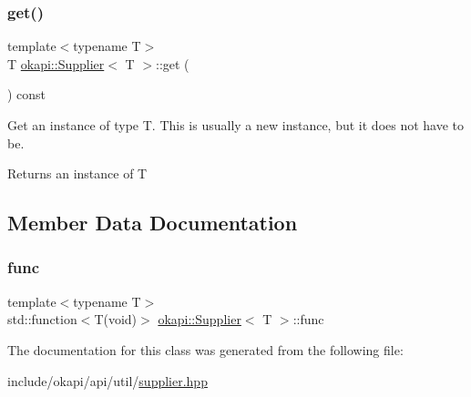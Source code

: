 \subsubsection{\texorpdfstring{get()}{get()}}
{\footnotesize\ttfamily template$<$typename T$>$ \\
T \mbox{\hyperlink{classokapi_1_1Supplier}{okapi\+::\+Supplier}}$<$ T $>$\+::get (\begin{DoxyParamCaption}{ }\end{DoxyParamCaption}) const\hspace{0.3cm}{\ttfamily [inline]}}

Get an instance of type T. This is usually a new instance, but it does not have to be. \begin{DoxyReturn}{Returns}
an instance of T 
\end{DoxyReturn}


\subsection{Member Data Documentation}
\mbox{\label{classokapi_1_1Supplier_aad4dde721930a73ed5077011bab8203c}} 
\subsubsection{\texorpdfstring{func}{func}}
{\footnotesize\ttfamily template$<$typename T$>$ \\
std\+::function$<$T(void)$>$ \mbox{\hyperlink{classokapi_1_1Supplier}{okapi\+::\+Supplier}}$<$ T $>$\+::func\hspace{0.3cm}{\ttfamily [protected]}}



The documentation for this class was generated from the following file\+:\begin{DoxyCompactItemize}
\item 
include/okapi/api/util/\mbox{\hyperlink{supplier_8hpp}{supplier.\+hpp}}\end{DoxyCompactItemize}
